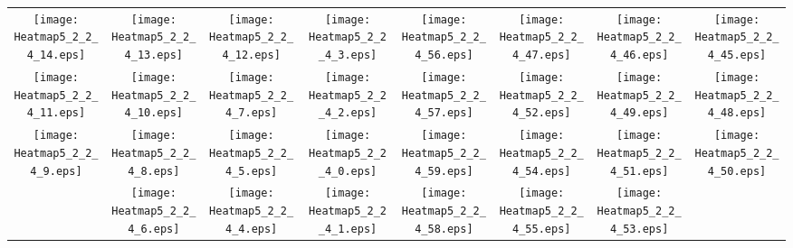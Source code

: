 \documentclass{standalone}
\begin{document}
\begin{tabular}{ *8{c} }
\texttt{[image: Heatmap5\_2\_2\_4\_14.eps]} & \texttt{[image: Heatmap5\_2\_2\_4\_13.eps]} & \texttt{[image: Heatmap5\_2\_2\_4\_12.eps]} & \texttt{[image: Heatmap5\_2\_2\_4\_3.eps]} & \texttt{[image: Heatmap5\_2\_2\_4\_56.eps]} & \texttt{[image: Heatmap5\_2\_2\_4\_47.eps]} & \texttt{[image: Heatmap5\_2\_2\_4\_46.eps]} & \texttt{[image: Heatmap5\_2\_2\_4\_45.eps]} \\
\texttt{[image: Heatmap5\_2\_2\_4\_11.eps]} & \texttt{[image: Heatmap5\_2\_2\_4\_10.eps]} & \texttt{[image: Heatmap5\_2\_2\_4\_7.eps]} & \texttt{[image: Heatmap5\_2\_2\_4\_2.eps]} & \texttt{[image: Heatmap5\_2\_2\_4\_57.eps]} & \texttt{[image: Heatmap5\_2\_2\_4\_52.eps]} & \texttt{[image: Heatmap5\_2\_2\_4\_49.eps]} & \texttt{[image: Heatmap5\_2\_2\_4\_48.eps]} \\
\texttt{[image: Heatmap5\_2\_2\_4\_9.eps]} & \texttt{[image: Heatmap5\_2\_2\_4\_8.eps]} & \texttt{[image: Heatmap5\_2\_2\_4\_5.eps]} & \texttt{[image: Heatmap5\_2\_2\_4\_0.eps]} & \texttt{[image: Heatmap5\_2\_2\_4\_59.eps]} & \texttt{[image: Heatmap5\_2\_2\_4\_54.eps]} & \texttt{[image: Heatmap5\_2\_2\_4\_51.eps]} & \texttt{[image: Heatmap5\_2\_2\_4\_50.eps]} \\
 & \texttt{[image: Heatmap5\_2\_2\_4\_6.eps]} & \texttt{[image: Heatmap5\_2\_2\_4\_4.eps]} & \texttt{[image: Heatmap5\_2\_2\_4\_1.eps]} & \texttt{[image: Heatmap5\_2\_2\_4\_58.eps]} & \texttt{[image: Heatmap5\_2\_2\_4\_55.eps]} & \texttt{[image: Heatmap5\_2\_2\_4\_53.eps]} &  
\end{tabular}
\end{document}
